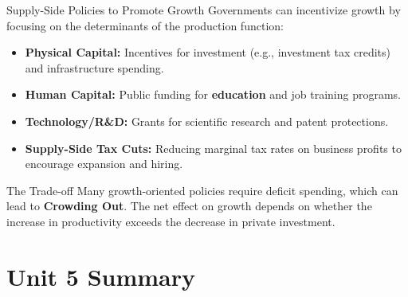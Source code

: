 \documentclass[aspectratio=169]{beamer}
\begin{document}
\begin{frame}{Supply-Side Policies to Promote Growth}
    Governments can incentivize growth by focusing on the determinants of the production function:
    
    \begin{itemize}
        \item \textbf{Physical Capital:} Incentives for investment (e.g., investment tax credits) and infrastructure spending.
        \item \textbf{Human Capital:} Public funding for \textbf{education} and job training programs.
        \item \textbf{Technology/R\&D:} Grants for scientific research and patent protections.
        \item \textbf{Supply-Side Tax Cuts:} Reducing marginal tax rates on business profits to encourage expansion and hiring.
    \end{itemize}
    
    \begin{alertblock}{The Trade-off}
        Many growth-oriented policies require deficit spending, which can lead to \textbf{Crowding Out}. The net effect on growth depends on whether the increase in productivity exceeds the decrease in private investment.
    \end{alertblock}
\end{frame}

\section{Unit 5 Summary}
\end{document}
